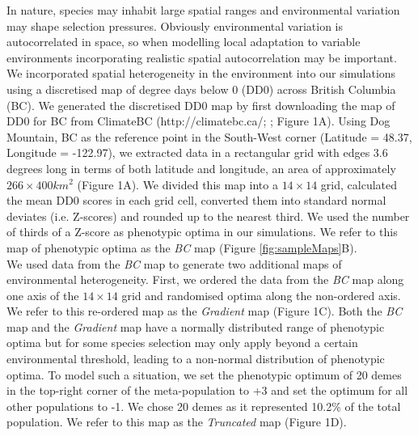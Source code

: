 \documentclass[10pt,twoside,lineno]{GSA_format}
\begin{document}
In nature, species may inhabit large spatial ranges and environmental variation may shape selection pressures. Obviously environmental variation is autocorrelated in space, so when modelling local adaptation to variable environments incorporating realistic spatial autocorrelation may be important. We incorporated spatial heterogeneity in the environment into our simulations using a discretised map of degree days below 0 (DD0) across British Columbia (BC). We generated the discretised DD0 map by first downloading the map of DD0 for BC from ClimateBC (http://climatebc.ca/; \cite{Wang2016}; Figure 1A). Using Dog Mountain, BC as the reference point in the South-West corner (Latitude = 48.37, Longitude = -122.97), we extracted data in a rectangular grid with edges 3.6 degrees long in terms of both latitude and longitude, an area of approximately $266\times400 km^2$ (Figure 1A). We divided this map into a $14\times14$ grid, calculated the mean DD0 scores in each grid cell, converted them into standard normal deviates (i.e. Z-scores) and rounded up to the nearest third. We used the number of thirds of a Z-score as phenotypic optima in our simulations. We refer to this map of phenotypic optima as the \textit{BC} map (Figure \ref{fig:sampleMaps}B).\\

We used data from the \textit{BC} map to generate two additional maps of environmental heterogeneity. First, we ordered the data from the \textit{BC} map along one axis of the $14\times14$ grid and randomised optima along the non-ordered axis. We refer to this re-ordered map as the \textit{Gradient} map (Figure 1C). Both the \textit{BC} map and the \textit{Gradient} map have a normally distributed range of phenotypic optima but for some species selection may only apply beyond a certain environmental threshold, leading to a non-normal distribution of phenotypic optima. To model such a situation, we set the phenotypic optimum of 20 demes in the top-right corner of the meta-population to +3 and set the optimum for all other populations to -1. We chose 20 demes as it represented 10.2\% of the total population. We refer to this map as the \textit{Truncated} map (Figure 1D).\\

\end{document}
